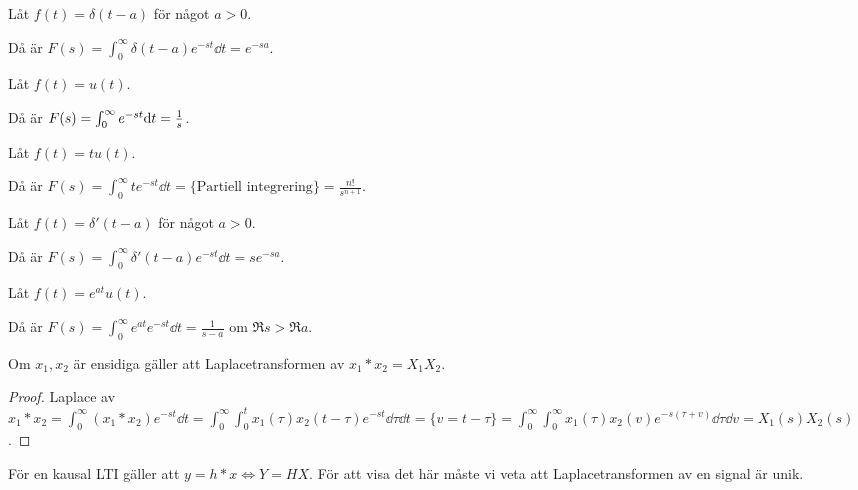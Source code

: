 \documentclass[a4paper]{article}
\begin{document}
\begin{ex}
    Låt \(
        f(t) = \delta(t-a)
    \) för något \(
        a > 0
    \).

    Då är \(
        F(s) = \int_0^\infty \delta(t-a) e^{-st} \dd t 
             = e^{-sa}
    \).
\end{ex}

\begin{ex}
    Låt \(
        f(t) = u(t)
    \). 

    Då är \(
        F(s) = \int_0^\infty e^{-st} \dd t = \frac{1}{s}
    \).
\end{ex}

\begin{ex}
    Låt \(
        f(t) = tu(t)
    \).

    Då är \(
        F(s) = \int_0^\infty te^{-st} \dd t = \{\text{Partiell integrering}\} = \frac{n!}{s^{n+1}} 
    \).
\end{ex}

\begin{ex}
    Låt \(
        f(t) = \delta'(t-a)
    \) för något \(
        a > 0
    \). 

    Då är \(
        F(s) = \int_0^\infty \delta'(t-a) e^{-st} \dd t = se^{-sa}
    \).
\end{ex}

\begin{ex}
    Låt \(
        f(t) = e^{at}u(t)
    \). 

    Då är \(
        F(s) = \int_0^\infty e^{at} e^{-st} \dd t = \frac{1}{s-a} 
    \) om \(
        \Re{s} > \Re{a}
    \).
\end{ex}

\begin{påst}
    Om \(
        x_1, x_2
    \) är ensidiga gäller att Laplacetransformen av \(
        x_1 * x_2 = X_1X_2
    \).

    \begin{proof}
        Laplace av \(
            x_1*x_2 = \int_0^\infty (x_1 * x_2) e^{-st} \dd t
                    = \int_0^\infty \int_0^t x_1(\tau) x_2(t-\tau) e^{-st} \dd \tau \dd t
                    = \{ v = t-\tau \}
                    = \int_0^\infty \int_0^\infty x_1(\tau) x_2(v) e^{-s(\tau + v)} \dd \tau \dd v
                    = X_1(s)X_2(s)
        \).
    \end{proof}
\end{påst}

För en kausal LTI gäller att \(
    y = h*x \iff Y = HX
\). För att visa det här måste vi veta att Laplacetransformen av en signal är 
unik. 
\end{document}

